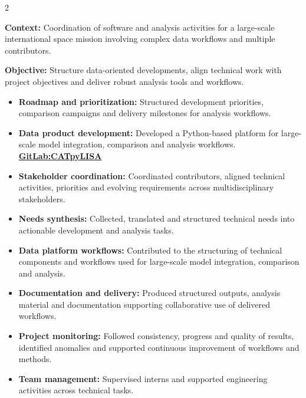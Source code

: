 \documentclass[8pt,a4paper,ragged2e,withhyper]{altacv}
\begin{document}
\begin{paracol}{2}
\divider


\textbf{Context:} Coordination of software and analysis activities for a large-scale international space mission involving complex data workflows and multiple contributors.

\textbf{Objective:} Structure data-oriented developments, align technical work with project objectives and deliver robust analysis tools and workflows.

\begin{itemize}
\item \textbf{Roadmap and prioritization:} Structured development priorities, comparison campaigns and delivery milestones for analysis workflows.
\item \textbf{Data product development:} Developed a Python-based platform for large-scale model integration, comparison and analysis workflows. \textcolor{DarkPastelRed}{\href{https://gitlab.oca.eu/gboileau/lisa_l3_tools}{\bf GitLab:CATpyLISA}}
\item \textbf{Stakeholder coordination:} Coordinated contributors, aligned technical activities, priorities and evolving requirements across multidisciplinary stakeholders.
\item \textbf{Needs synthesis:} Collected, translated and structured technical needs into actionable development and analysis tasks.
\item \textbf{Data platform workflows:} Contributed to the structuring of technical components and workflows used for large-scale model integration, comparison and analysis.
\item \textbf{Documentation and delivery:} Produced structured outputs, analysis material and documentation supporting collaborative use of delivered workflows.
\item \textbf{Project monitoring:} Followed consistency, progress and quality of results, identified anomalies and supported continuous improvement of workflows and methods.
\item \textbf{Team management:} Supervised interns and supported engineering activities across technical tasks.
\end{itemize}

\divider



\end{paracol}
\end{document}
